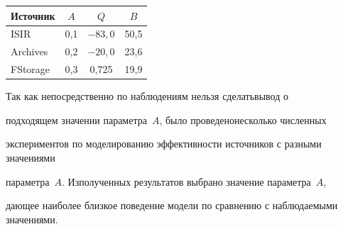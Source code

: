 \begin{table}
\begin{minipage}[t]{140pt}


\end{minipage}


\hfill




\begin{minipage}[t]{160pt}


\begin{center}


\tabcolsep=7.1pt


\begin{tabular}{|l|c|c|c|}


\hline


\multicolumn{1}{|c|}{Источник}&$A$&$Q$&$B$\\


\hline


ISIR&0,1&$-83{,}0$&50,5\\


Archives&0,2&$-20{,}0$&23,6\\


FStorage&0,3&0,725&19,9\\


      \hline


      \end{tabular}


      \end{center}


      \end{minipage}


      \vspace*{-12pt}


      \end{table}


 


      


      Так как непосредственно по наблюдениям нельзя сделать\linebreak вывод о 


подходящем значении параметра~$A$, было проведено\linebreak несколько численных 


экспериментов по моделированию эффективности источников с разными значениями 


параметра~$A$. Из\linebreak получен\-ных результатов выбрано значение параметра~$A$, 


дающее наиболее близкое поведение модели по сравнению с наблю\-да\-емы\-ми значениями. 


